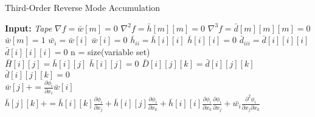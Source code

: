 \documentclass[oneside]{article}
\begin{document}
\clearpage

\begin{algorithm*}[!htb]
  \caption{Third-Order Reverse Mode Accumulation}
  \begin{algorithmic}[1]
\State \textbf{Input:} \textit{Tape} 
\State $\nabla f = \bar{w}[m] = 0$ 
\State $\nabla^2 f =  \bar{h}[m][m] = 0$ 
\State $\nabla^3 f =  \bar{d}[m][m][m] = 0$ \\

\State $\bar{w}[m] = 1$
\State $\bar{w_i}=\bar{w}[i]$
\State $\bar{w}[i] = 0$
\State $\bar{h}_{ii}=\bar{h}[i][i]$
\State $\bar{h}[i][i] = 0$
\State $\bar{d}_{iii}=\bar{d}[i][i][i]$
\State $\bar{d}[i][i][i] = 0$
\State n = size(variable set) \\
\State $\bar{H}[i][j] = \bar{h}[i][j]$
\State $\bar{h}[i][j] = 0$
\State $\bar{D}[i][j][k] = \bar{d}[i][j][k]$
\State $\bar{d}[i][j][k] = 0$
\EndFor
\EndFor \\
\State $\bar{w}[j] +=  \frac{\partial \phi_i}{\partial x_i}\bar{w}[i]$
\State  $\bar{h}[j][k] += \bar{h}[i][k]  \frac{\partial \phi_i}{\partial x_j} + \bar{h}[i][j]  \frac{\partial \phi_i}{\partial x_k}+\bar{h}[i][i]  \frac{\partial \phi_i}{\partial x_k} \frac{\partial \phi_i}{\partial x_j} + \bar{w_i}\frac{\partial^2 \phi_i}{\partial x_j \partial x_k}$
\State  {}
\end{algorithmic}
\end{algorithm*}
\end{document}
